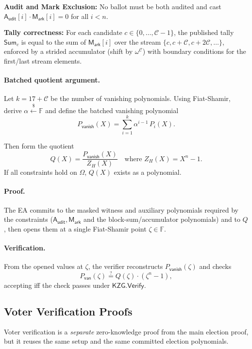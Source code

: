 \noindent\textbf{Audit and Mark Exclusion:}
No ballot must be both audited and cast $\mathsf{A_{udit}}[i]\cdot \mathsf{M_{ark}}[i]=0$ for all $i < n$.

\noindent\textbf{Tally correctness:}
For each candidate $c\in\{0,\dots,\mathcal{C}-1\}$, the published tally $\mathsf{Sum}_c$ is equal to the sum of $\mathsf{M_{ark}}[i]$ over the
stream $\{c, c+\mathcal{C}, c+2\mathcal{C},\dots\}$, enforced by a strided accumulator (shift by $\omega^\mathcal{C}$) with boundary conditions
for the first/last stream elements.

\paragraph{Batched quotient argument.}
Let $k=17+\mathcal{C}$ be the number of vanishing polynomials. 
Using Fiat-Shamir, derive $\alpha \stackrel{\$}{\leftarrow} \mathbb{F}$ and define the batched vanishing polynomial
\begin{equation*}
P_{\mathsf{vanish}}(X)=\sum_{i=1}^{k}\alpha^{i-1}\,P_i(X).
\end{equation*}

Then form the quotient
\[
Q(X)=\frac{P_{\mathsf{vanish}}(X)}{Z_H(X)} \quad \text{where } Z_H(X)=X^n-1.
\]
If all constraints hold on $\Omega$, $Q(X)$ exists as a polynomial.  

\paragraph{Proof.}
The EA commits to the masked witness and auxiliary polynomials required by the constraints
($\mathsf{A_{udit}},\mathsf{M_{ark}}$ and the block-sum/accumulator polynomials) and to $Q$,
then opens them at a single Fiat-Shamir point $\zeta\in\mathbb{F}$.  

\paragraph{Verification.}
From the opened values at $\zeta$, the verifier reconstructs $P_{\mathsf{vanish}}(\zeta)$ and checks
\begin{equation*}
P_{\mathsf{van}}(\zeta) \stackrel{?}{=} Q(\zeta)\cdot(\zeta^n-1),
\end{equation*}
accepting iff the check passes under $\mathsf{KZG.Verify}$.  

\subsection{Voter Verification Proofs}
Voter verification is a \emph{separate} zero-knowledge proof from the main election proof, but it reuses the same setup and the same committed election polynomials.  

